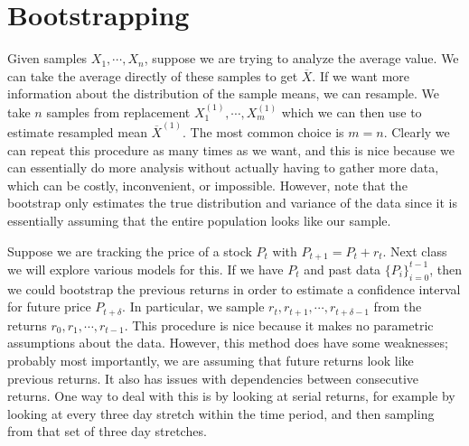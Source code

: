 \section{Bootstrapping}
Given samples $X_1,\cdots,X_n$, suppose we are trying to analyze the average value. We can take the average directly of these samples to get $\overline X$. If we want more information about the distribution of the sample means, we can resample. We take $n$ samples from replacement $X_1^{(1)},\cdots,X_m^{(1)}$ which we can then use to estimate resampled mean $\overline X^{(1)}$. The most common choice is $m=n$. Clearly we can repeat this procedure as many times as we want, and this is nice because we can essentially do more analysis without actually having to gather more data, which can be costly, inconvenient, or impossible. However, note that the bootstrap only estimates the true distribution and variance of the data since it is essentially assuming that the entire population looks like our sample.

Suppose we are tracking the price of a stock $P_t$ with $P_{t+1}=P_t + r_t$. Next class we will explore various models for this. If we have $P_t$ and past data $\{P_i\}_{i=0}^{t-1}$, then we could bootstrap the previous returns in order to estimate a confidence interval for future price $P_{t+\delta}$. In particular, we sample $r_t,r_{t+1},\cdots,r_{t+\delta-1}$ from the returns $r_0,r_1,\cdots,r_{t-1}$. This procedure is nice because it makes no parametric assumptions about the data. However, this method does have some weaknesses; probably most importantly, we are assuming that future returns look like previous returns. It also has issues with dependencies between consecutive returns. One way to deal with this is by looking at serial returns, for example by looking at every three day stretch within the time period, and then sampling from that set of three day stretches.

